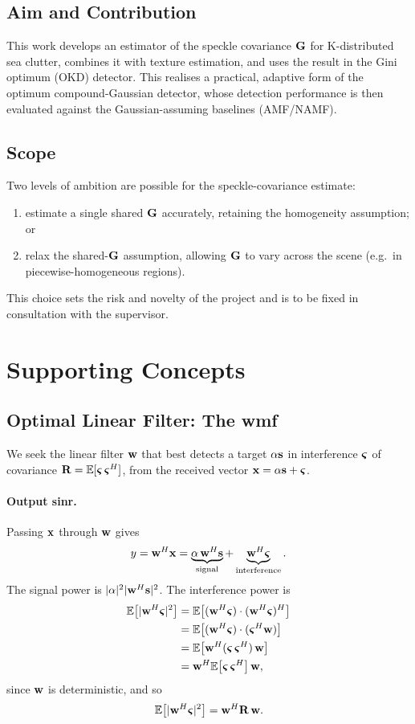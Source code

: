 \documentclass{article}
\begin{document}
\subsection{Aim and Contribution}
This work develops an estimator of the speckle covariance $\mathbf{G}$ for K-distributed sea
clutter, combines it with texture estimation, and uses the result in the Gini optimum
(OKD) detector. This realises a practical, adaptive form of the optimum
compound-Gaussian detector, whose detection performance is then evaluated against the
Gaussian-assuming baselines (AMF/NAMF).

\subsection{Scope}
Two levels of ambition are possible for the speckle-covariance estimate:
\begin{enumerate}
  \item estimate a single shared $\mathbf{G}$ accurately, retaining the homogeneity
  assumption; or
  \item relax the shared-$\mathbf{G}$ assumption, allowing $\mathbf{G}$ to vary across the scene
  (e.g.\ in piecewise-homogeneous regions).
\end{enumerate}
This choice sets the risk and novelty of the project and is to be fixed in consultation
with the supervisor.


\newpage
\section{Supporting Concepts}
\subsection{Optimal Linear Filter: The \Gls{wmf}}
\label{app:wmf}
We seek the linear filter $\vb w$ that best detects a target $\alpha\vb s$ in interference $\boldsymbol{\varsigma}$ of covariance $\vb R = \mathbb{E}[\boldsymbol{\varsigma}\,\boldsymbol{\varsigma}^H]$, from the received vector $\vb x = \alpha\vb s + \boldsymbol{\varsigma}$.

\paragraph{Output \Gls{sinr}.}
Passing $\vb x$ through $\vb w$ gives
\[
  y = \vb w^H\vb x
    = \underbrace{\alpha\,\vb w^H\vb s}_{\text{signal}}
    + \underbrace{\vb w^H\boldsymbol{\varsigma}}_{\text{interference}}.
\]
The signal power is $|\alpha|^2|\vb w^H\vb s|^2$. The interference power is 
\begin{align}
    \mathbb{E}\!\left[|\vb w^H\boldsymbol{\varsigma}|^2\right] &= \mathbb{E}\!\left[(\vb w^H\boldsymbol{\varsigma})\cdot(\vb w^H\boldsymbol{\varsigma})^H\right] \nonumber\\
    &= \mathbb{E}\!\left[(\vb w^H\boldsymbol{\varsigma})\cdot(\boldsymbol{\varsigma}^H\vb w)\right] \nonumber\\
    &= \mathbb{E}\!\left[\vb w^H(\boldsymbol{\varsigma}\,\boldsymbol{\varsigma}^H)\,\vb w\right] \nonumber\\
    &= \vb w^H \mathbb{E}\!\left[\boldsymbol{\varsigma}\,\boldsymbol{\varsigma}^H\right] \vb w, \nonumber
\end{align}
since $\vb w$ is deterministic, and so 
$$\mathbb{E}\!\left[|\vb w^H\boldsymbol{\varsigma}|^2\right] = \vb w^H\vb R\,\vb w.$$ \\
\end{document}
